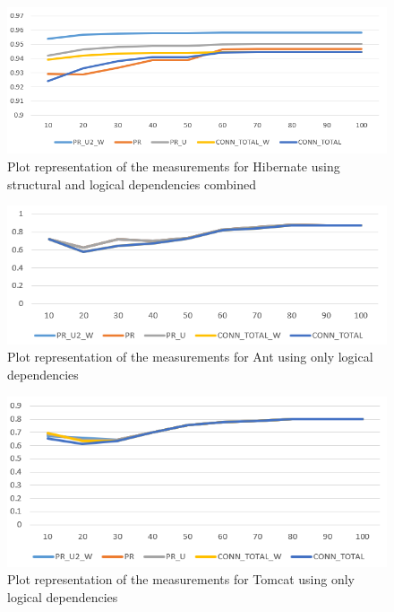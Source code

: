 \documentclass[12pt]{mitthesis}
\begin{document}
\begin{figure}[H]
\centering
\includegraphics[width=\textwidth]{hibernate_SD_LD.PNG}
\caption{ Plot representation of the measurements for Hibernate using structural and logical dependencies combined }
\label{fig:plot_sd_ld_hibernate}
\centering
\end{figure}



\begin{figure}[H]
\centering
\includegraphics[width=\textwidth]{ant_LD.PNG}
\caption{ Plot representation of the measurements for Ant using only logical dependencies }
\label{fig:plot_ld_ant}
\centering
\end{figure}


\begin{figure}[H]
\centering
\includegraphics[width=\textwidth]{tomcat_LD.PNG}
\caption{ Plot representation of the measurements for Tomcat using only logical dependencies }
\label{fig:plot_ld_tomcat}
\centering
\end{figure}
\end{document}
